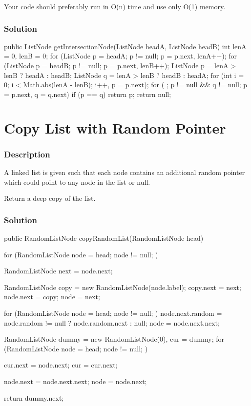 Your code should preferably run in O(n) time and use only O(1) memory.
\subsubsection{Solution}

\begin{Code}
public ListNode getIntersectionNode(ListNode headA, ListNode headB) {
    int lenA = 0, lenB = 0;
    for (ListNode p = headA; p != null; p = p.next, lenA++);
    for (ListNode p = headB; p != null; p = p.next, lenB++);
    ListNode p = lenA > lenB ? headA : headB;
    ListNode q = lenA > lenB ? headB : headA;
    for (int i = 0; i < Math.abs(lenA - lenB); i++, p = p.next);
    for ( ; p != null && q != null; p = p.next, q = q.next) {
        if (p == q) {
            return p;
        }
    }
    return null;
}
\end{Code}

\newpage

\section{Copy List with Random Pointer} %

\subsubsection{Description}
A linked list is given such that each node contains an additional random pointer which could point to any node in the list or null.

Return a deep copy of the list.
\subsubsection{Solution}

\begin{Code}
public RandomListNode copyRandomList(RandomListNode head) {
    for (RandomListNode node = head; node != null; ) {
        RandomListNode next = node.next;

        RandomListNode copy = new RandomListNode(node.label);
        copy.next = next;
        node.next = copy;
        node = next;
    }

    for (RandomListNode node = head; node != null; ) {
        node.next.random = node.random != null ? node.random.next : null;
        node = node.next.next;
    }

    RandomListNode dummy = new RandomListNode(0), cur = dummy;
    for (RandomListNode node = head; node != null; ) {
        cur.next = node.next;
        cur = cur.next;

        node.next = node.next.next;
        node = node.next;
    }

    return dummy.next;
}
\end{Code}


